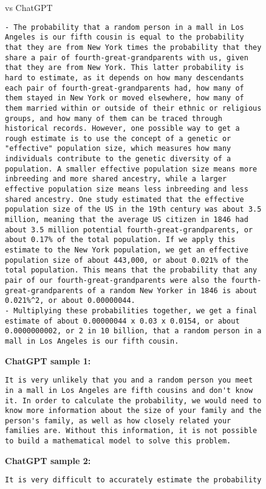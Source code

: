 \begin{figure}[H]
\begin{AIbox}{\DV vs ChatGPT}
\begin{verbatim}
- The probability that a random person in a mall in Los Angeles is our fifth cousin is equal to the probability that they are from New York times the probability that they share a pair of fourth-great-grandparents with us, given that they are from New York. This latter probability is hard to estimate, as it depends on how many descendants each pair of fourth-great-grandparents had, how many of them stayed in New York or moved elsewhere, how many of them married within or outside of their ethnic or religious groups, and how many of them can be traced through historical records. However, one possible way to get a rough estimate is to use the concept of a genetic or "effective" population size, which measures how many individuals contribute to the genetic diversity of a population. A smaller effective population size means more inbreeding and more shared ancestry, while a larger effective population size means less inbreeding and less shared ancestry. One study estimated that the effective population size of the US in the 19th century was about 3.5 million, meaning that the average US citizen in 1846 had about 3.5 million potential fourth-great-grandparents, or about 0.17% of the total population. If we apply this estimate to the New York population, we get an effective population size of about 443,000, or about 0.021% of the total population. This means that the probability that any pair of our fourth-great-grandparents were also the fourth-great-grandparents of a random New Yorker in 1846 is about 0.021%^2, or about 0.00000044. 
- Multiplying these probabilities together, we get a final estimate of about 0.00000044 x 0.03 x 0.0154, or about 0.0000000002, or 2 in 10 billion, that a random person in a mall in Los Angeles is our fifth cousin.
\end{verbatim}
{\bf ChatGPT sample 1:}
\begin{verbatim}
It is very unlikely that you and a random person you meet in a mall in Los Angeles are fifth cousins and don't know it. In order to calculate the probability, we would need to know more information about the size of your family and the person's family, as well as how closely related your families are. Without this information, it is not possible to build a mathematical model to solve this problem.
\end{verbatim}
{\bf ChatGPT sample 2:}
\begin{verbatim}
It is very difficult to accurately estimate the probability that two people are fifth cousins without more information. 

\end{verbatim}
\end{AIbox}
\end{figure}
